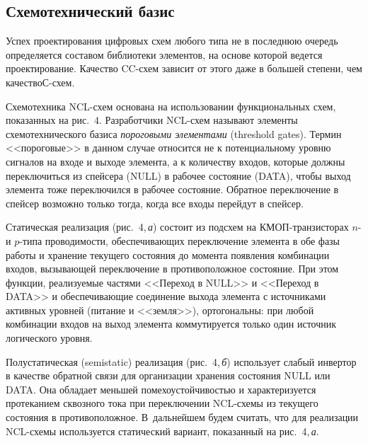 \begin{multicols}{2}
\vspace*{-3pt}
       
       \subsection{Схемотехнический базис}
       
       \vspace*{-2pt}
       
       Успех проектирования цифровых схем любого типа не в последнюю очередь 
определяется составом библиотеки элементов, на основе которой ведется проектирование. 
Качество CC-схем зависит от этого даже в большей степени, чем качество\linebreak С-схем. 
       
       Схемотехника NCL-схем основана на использовании функциональных схем, 
показанных на рис.~4. Разработчики NCL-схем называют элементы схемотехнического 
базиса \textit{пороговыми элементами} (threshold gates). Термин <<пороговые>> в данном 
случае относится не к потенциальному уровню сигналов на входе и выходе элемента, а к 
количеству входов, которые должны переключиться из спейсера (NULL) в рабочее состояние 
(DATA), чтобы выход элемента тоже переключился в рабочее состояние. Обратное 
переключение в спейсер возможно только тогда, когда все входы перейдут в спейсер.
      

      
       Статическая реализация (рис.~4,\,\textit{а}) состоит из подсхем на 
       КМОП-тран\-зис\-то\-рах $n$- и $p$-ти\-па проводимости, обеспечивающих 
переключение элемента в обе фазы работы и хранение текущего состояния до момента 
появления комбинации входов, вызывающей переключение в противоположное состояние. 
При этом функции, реализуемые частями <<Переход в NULL>> и <<Переход в DATA>> и 
обеспечивающие соединение выхода элемента с источниками активных уровней (питание и 
<<земля>>), ортогональны: при любой комбинации входов на выход элемента 
коммутируется только один источник логического уровня. 
       
       Полустатическая (semistatic) реализация (рис.~4,\,\textit{б}) использует слабый 
инвертор в качестве обратной связи для организации хранения состояния NULL или DATA. 
Она обладает меньшей помехоустойчивостью и характеризуется протеканием сквозного тока 
при переключении NCL-схе\-мы из текущего состояния в противоположное. В~дальнейшем 
будем считать, что для реализации NCL-схе\-мы используется статический вариант, 
показанный на рис.~4,\,\textit{а}.
       

\end{multicols}
